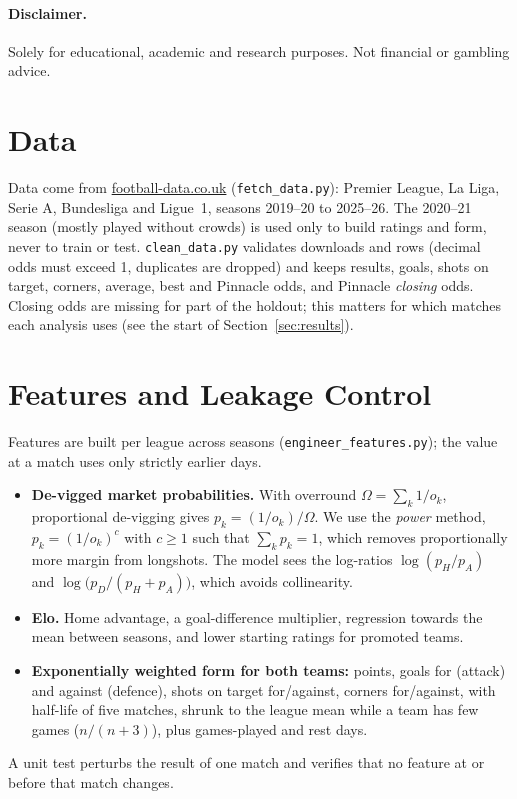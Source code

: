 \documentclass[11pt,a4paper]{article}
\begin{document}
\paragraph{Disclaimer.} Solely for educational, academic and research purposes. Not financial or gambling advice.

\section{Data}
Data come from \url{football-data.co.uk} (\texttt{fetch\_data.py}): Premier League, La Liga, Serie A, Bundesliga and Ligue~1, seasons 2019--20 to 2025--26. The 2020--21 season (mostly played without crowds) is used only to build ratings and form, never to train or test. \texttt{clean\_data.py} validates downloads and rows (decimal odds must exceed 1, duplicates are dropped) and keeps results, goals, shots on target, corners, average, best and Pinnacle odds, and Pinnacle \emph{closing} odds. Closing odds are missing for part of the holdout; this matters for which matches each analysis uses (see the start of Section~\ref{sec:results}).

\section{Features and Leakage Control}
Features are built per league across seasons (\texttt{engineer\_features.py}); the value at a match uses only strictly earlier days.
\begin{itemize}[noitemsep]
  \item \textbf{De-vigged market probabilities.} With overround $\Omega=\sum_k 1/o_k$, proportional de-vigging gives $p_k=(1/o_k)/\Omega$. We use the \emph{power} method, $p_k=(1/o_k)^{c}$ with $c\ge1$ such that $\sum_k p_k=1$, which removes proportionally more margin from longshots. The model sees the log-ratios $\log(p_H/p_A)$ and $\log\big(p_D/(p_H+p_A)\big)$, which avoids collinearity.
  \item \textbf{Elo.} Home advantage, a goal-difference multiplier, regression towards the mean between seasons, and lower starting ratings for promoted teams.
  \item \textbf{Exponentially weighted form for both teams:} points, goals for (attack) and against (defence), shots on target for/against, corners for/against, with half-life of five matches, shrunk to the league mean while a team has few games ($n/(n+3)$), plus games-played and rest days.
\end{itemize}
A unit test perturbs the result of one match and verifies that no feature at or before that match changes.
\end{document}
